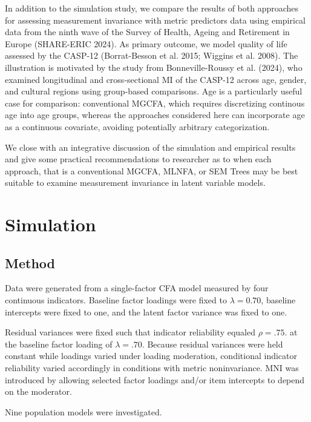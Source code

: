 \documentclass[
  man,
  floatsintext]{apa7}
\begin{document}
In addition to the simulation study, we compare the results of both
approaches for assessing measurement invariance with metric predictors
data using empirical data from the ninth wave of the Survey of Health,
Ageing and Retirement in Europe (SHARE-ERIC 2024). As primary outcome,
we model quality of life assessed by the CASP-12 (Borrat-Besson et al.
2015; Wiggins et al. 2008). The illustration is motivated by the study
from Bonneville-Roussy et al. (2024), who examined longitudinal and
cross-sectional MI of the CASP-12 across age, gender, and cultural
regions using group-based comparisons. Age is a particularly useful case
for comparison: conventional MGCFA, which requires discretizing
continous age into age groups, whereas the approaches considered here
can incorporate age as a continuous covariate, avoiding potentially
arbitrary categorization.

We close with an integrative discussion of the simulation and empirical
results and give some practical recommendations to researcher as to when
each approach, that is a conventional MGCFA, MLNFA, or SEM Trees may be
best suitable to examine measurement invariance in latent variable
models.

\section{Simulation}\label{simulation}

\subsection{Method}\label{method}

Data were generated from a single-factor CFA model measured by four
continuous indicators. Baseline factor loadings were fixed to
\(\lambda = 0.70\), baseline intercepts were fixed to one, and the
latent factor variance was fixed to one.

Residual variances were fixed such that indicator reliability equaled
\(\rho = .75.\) at the baseline factor loading of \(\lambda=.70\).
Because residual variances were held constant while loadings varied
under loading moderation, conditional indicator reliability varied
accordingly in conditions with metric noninvariance. MNI was introduced
by allowing selected factor loadings and/or item intercepts to depend on
the moderator.

Nine population models were investigated.
\end{document}
